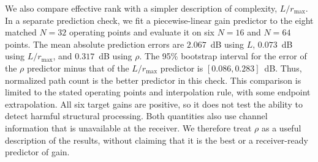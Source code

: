 
We also compare effective rank with a simpler description of complexity,
$L/r_{\max}$. In a separate prediction check, we fit a piecewise-linear
gain predictor to the eight matched $N=32$ operating points and evaluate
it on six $N=16$ and $N=64$ points. The mean absolute prediction errors
are $2.067$~dB using $L$, $0.073$~dB using $L/r_{\max}$, and
$0.317$~dB using $\rho$. The 95\% bootstrap interval for the error of
the $\rho$ predictor minus that of the $L/r_{\max}$ predictor is
$[0.086,0.283]$~dB. Thus, normalized path count is the better predictor
in this check. This comparison is limited to the stated operating points
and interpolation rule, with some endpoint extrapolation. All six target
gains are positive, so it does not test the ability to detect harmful
structural processing. Both quantities also use channel information that
is unavailable at the receiver. We therefore treat $\rho$ as a useful
description of the results, without claiming that it is the best or a
receiver-ready predictor of gain.
